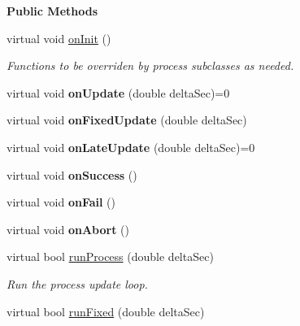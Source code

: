 \begin{Indent}\textbf{ Public Methods}\par
\begin{DoxyCompactItemize}
\item 
\mbox{\label{classrev_1_1_process_ab34756394f7f443306f115aea56b32f5}} 
virtual void \mbox{\hyperlink{classrev_1_1_process_ab34756394f7f443306f115aea56b32f5}{on\+Init}} ()
\begin{DoxyCompactList}\small\item\em Functions to be overriden by process subclasses as needed. \end{DoxyCompactList}\item 
\mbox{\label{classrev_1_1_process_a84e919ccc7c9ed583e943da0e33c4932}} 
virtual void {\bfseries on\+Update} (double delta\+Sec)=0
\item 
\mbox{\label{classrev_1_1_process_aeeb761e73c55d20e7346aaf676995830}} 
virtual void {\bfseries on\+Fixed\+Update} (double delta\+Sec)
\item 
\mbox{\label{classrev_1_1_process_abe59546dd3b5a18093c8a867a87d2a33}} 
virtual void {\bfseries on\+Late\+Update} (double delta\+Sec)=0
\item 
\mbox{\label{classrev_1_1_process_aa88c5e10cc54c8a6c767b4dcd5892c86}} 
virtual void {\bfseries on\+Success} ()
\item 
\mbox{\label{classrev_1_1_process_a258feb00bf8a714778f40b2edb4a5c41}} 
virtual void {\bfseries on\+Fail} ()
\item 
\mbox{\label{classrev_1_1_process_af71697ced47f08f1a64ace99f7ff479c}} 
virtual void {\bfseries on\+Abort} ()
\item 
virtual bool \mbox{\hyperlink{classrev_1_1_process_a0773cd6049d050ebcf72cd1034929c9c}{run\+Process}} (double delta\+Sec)
\begin{DoxyCompactList}\small\item\em Run the process update loop. \end{DoxyCompactList}\item 
virtual bool \mbox{\hyperlink{classrev_1_1_process_aedd5f4e2b9188fa376e36c3478db68a5}{run\+Fixed}} (double delta\+Sec)

\end{DoxyCompactItemize}
\end{Indent}
